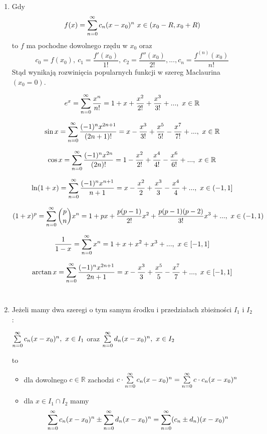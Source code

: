 \begin{enumerate}
    \item Gdy
    $$ f(x) = \sum\limits_{n = 0}^{\infty} c_n(x - x_0)^n \ x \in (x_0 - R, x_0 + R) $$ to $f$ ma pochodne dowolnego rzędu w $x_0$
    oraz $$ c_0 = f(x_0), \ c_1 = \frac{f'(x_0)}{1!}, \ c_2 = \frac{f''(x_0)}{2!}, ... , c_n = \frac{f^{(n)}(x_0)}{n!} $$
    Stąd wynikają rozwinięcia popularnych funkcji w szereg Maclaurina $(x_0 = 0)$.

    $$ e^x = \sum\limits_{n = 0}^{\infty} \frac{x^n}{n!} = 1 + x + \frac{x^2}{2!} + \frac{x^3}{3!} + ... , \ x \in \mathbb{R} $$
    
    $$ \sin x = \sum\limits_{n = 0}^{\infty} \frac{(-1)^n x^{2n+1}}{(2n + 1)!} = x - \frac{x^3}{3!} + \frac{x^5}{5!} - \frac{x^7}{7!} + ... , \ x \in \mathbb{R} $$

    $$ \cos x = \sum\limits_{n = 0}^{\infty} \frac{(-1)^n x^{2n}}{(2n)!} = 1 - \frac{x^2}{2!} + \frac{x^4}{4!} - \frac{x^6}{6!} + ... , \ x \in \mathbb{R} $$
    
    $$ \ln (1+x) = \sum\limits_{n = 0}^{\infty} \frac{(-1)^n x^{n+1}}{n+1} = x - \frac{x^2}{2} + \frac{x^3}{3} - \frac{x^4}{4} + ... , \ x \in (-1, 1] $$
    
    $$ (1+x)^p = \sum\limits_{n = 0}^{\infty} \binom{p}{n} x^n = 1 + px + \frac{p(p-1)}{2!}x^2 + \frac{p(p-1)(p-2)}{3!}x^3 + ... , \ x \in (-1, 1)  $$

    $$ \frac{1}{1-x} = \sum\limits_{n = 0}^{\infty} x^n = 1 + x + x^2 + x^3 + ... , \ x \in [-1, 1] $$

    $$ \arctan x = \sum\limits_{n = 0}^{\infty} \frac{(-1)^n x^{2n+1}}{2n+1} = x - \frac{x^3}{3} + \frac{x^5}{5} - \frac{x^7}{7} + ... , \ x \in [-1, 1] $$ \\

    \item Jeżeli mamy dwa szeregi o tym samym środku i przedziałach zbieżności $I_1$ i $I_2$:
    
    $ \sum\limits_{n = 0}^{\infty} c_n(x - x_0)^n, \ x \in I_1 $ oraz $ \sum\limits_{n = 0}^{\infty} d_n(x - x_0)^n, \ x \in I_2 $

    to

    \begin{itemize}
        \item dla dowolnego $c \in \mathbb{R}$ zachodzi $ c \cdot \sum\limits_{n = 0}^{\infty} c_n(x - x_0)^n = 
        \sum\limits_{n = 0}^{\infty} c \cdot c_n(x - x_0)^n $
        \item dla $ x \in I_1 \cap I_2 $ mamy
        $$ \sum\limits_{n = 0}^{\infty} c_n(x - x_0)^n \pm \sum\limits_{n = 0}^{\infty} d_n(x - x_0)^n = 
        \sum\limits_{n = 0}^{\infty} (c_n \pm d_n)(x - x_0)^n $$ \\
    \end{itemize}


\end{enumerate}
